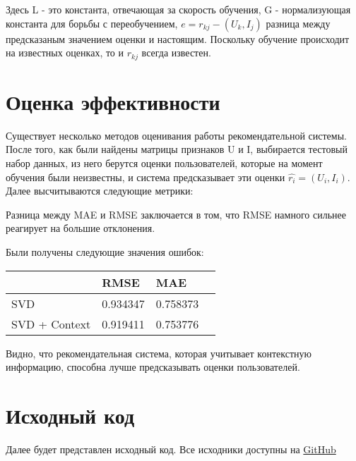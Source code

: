 Здесь L - это константа, отвечающая за скорость обучения, G - нормализующая константа для борьбы с переобучением, $e = r_{kj} - (U_k, I_j)$ разница между предсказаным значением оценки и настоящим. Поскольку обучение происходит на известных оценках, то и $r_{kj}$ всегда известен.

\section{Оценка эффективности}

Существует несколько методов оценивания работы рекомендательной системы. После того, как были найдены матрицы признаков U и I, выбирается тестовый набор данных, из него берутся оценки пользователей, которые на момент обучения были неизвестны, и система предсказывает эти оценки $\widehat{r_i} = (U_i, I_i)$. Далее высчитываются следующие метрики:


Разница между MAE и RMSE заключается в том, что RMSE намного сильнее реагирует на большие отклонения. 

Были получены следующие значения ошибок:

\begin{center}
  \begin{tabular}{| C{3.5cm} | C{1.5cm} | C{1.5cm} | @{}m{0pt}@{}}
    \hline
     & RMSE & MAE & \\[0.5em] \hline
    SVD & 0.934347 & 0.758373 & \\[1.4em] \hline
    SVD + Context & 0.919411 & 0.753776 & \\[1.4em]
    \hline
  \end{tabular}
\end{center}

Видно, что рекомендательная система, которая учитывает контекстную информацию, способна лучше предсказывать оценки пользователей.

\section{Исходный код}

Далее будет представлен исходный код. Все исходники доступны на \href{https://github.com/Makazone/2ndYear-TermProject}{GitHub}

% 
% 
% 
% 
% 
% 